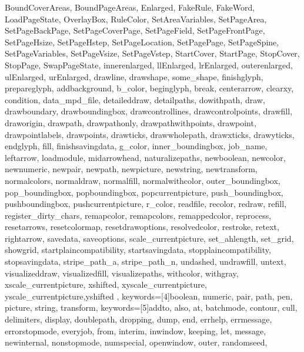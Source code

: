 {{        BoundCoverAreas, BoundPageAreas, Enlarged, FakeRule,%
        FakeWord, LoadPageState, OverlayBox, RuleColor,%
        SetAreaVariables, SetPageArea, SetPageBackPage,%
        SetPageCoverPage, SetPageField, SetPageFrontPage,%
        SetPageHsize, SetPageHstep, SetPageLocation,%
        SetPagePage, SetPageSpine, SetPageVariables,%
        SetPageVsize, SetPageVstep, StartCover, StartPage,%
        StopCover, StopPage, SwapPageState, innerenlarged,%
        llEnlarged, lrEnlarged, outerenlarged, ulEnlarged, urEnlarged,%
        drawline, drawshape, some_shape,%
        finishglyph, prepareglyph,%
        addbackground, b_color, beginglyph, break, centerarrow,%
        clearxy, condition, data_mpd_file, detaileddraw,%
        detailpaths, dowithpath, draw, drawboundary,%
        drawboundingbox, drawcontrollines, drawcontrolpoints,%
        drawfill, draworigin, drawpath, drawpathonly,%
        drawpathwithpoints, drawpoint, drawpointlabels,%
        drawpoints, drawticks, drawwholepath, drawxticks,%
        drawyticks, endglyph, fill, finishsavingdata, g_color,%
        inner_boundingbox, job_name, leftarrow, loadmodule,%
        midarrowhead, naturalizepaths, newboolean, newcolor,%
        newnumeric, newpair, newpath, newpicture, newstring,%
        newtransform, normalcolors, normaldraw, normalfill,%
        normalwithcolor, outer_boundingbox, pop_boundingbox,%
        popboundingbox, popcurrentpicture, push_boundingbox,%
        pushboundingbox, pushcurrentpicture, r_color, readfile,%
        recolor, redraw, refill, register_dirty_chars,%
        remapcolor, remapcolors, remappedcolor, reprocess,%
        resetarrows, resetcolormap, resetdrawoptions,%
        resolvedcolor, restroke, retext, rightarrow, savedata,%
        saveoptions, scale_currentpicture, set_ahlength,%
        set_grid, showgrid, startplaincompatibility,%
        startsavingdata, stopplaincompatibility,%
        stopsavingdata, stripe_path_a, stripe_path_n, undashed,%
        undrawfill, untext, visualizeddraw, visualizedfill,%
        visualizepaths, withcolor, withgray,%
        xscale_currentpicture, xshifted,%
        xyscale_currentpicture, yscale_currentpicture,yshifted%
    },%
    keywords=[4]{boolean, numeric, pair, path, pen, picture, string, transform},%
    keywords=[5]{addto, also, at, batchmode, contour, cull, delimiters,%
        display, doublepath, dropping, dump, end, errhelp,%
        errmessage, errorstopmode, everyjob, from, interim,%
        inwindow, keeping, let, message, newinternal,%
        nonstopmode, numspecial, openwindow, outer, randomseed,%
}}
